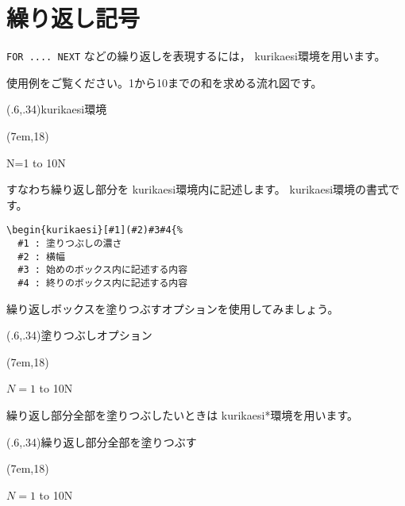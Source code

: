 \documentclass[a4j]{jarticle}
\begin{document}
\section{繰り返し記号}
\verb+FOR .... NEXT+ などの繰り返しを表現するには，
\textsf{kurikaesi}環境を用います。

使用例をご覧ください。1から10までの和を求める流れ図です。

\begin{showEx}(.6,.34){\textsf{kurikaesi}環境}
\begin{nagarezu}%
  (7em,18\baselineskip)
\sitahe
{}
\sitahe
\begin{kurikaesi}{N=1 to 10}{N}
\sitahe
{}
\sitahe
\end{kurikaesi}
\sitahe
{}
\sitahe
{}
\end{nagarezu}%
\end{showEx}

すなわち繰り返し部分を \textsf{kurikaesi}環境内に記述します。
\textsf{kurikaesi}環境の書式です。

\begin{boxnote}
\begin{verbatim}
\begin{kurikaesi}[#1](#2)#3#4{%
  #1 : 塗りつぶしの濃さ
  #2 : 横幅
  #3 : 始めのボックス内に記述する内容
  #4 : 終りのボックス内に記述する内容
\end{verbatim}
\end{boxnote}

繰り返しボックスを塗りつぶすオプションを使用してみましょう。

\begin{showEx}(.6,.34){塗りつぶしオプション}
\begin{caprm}
\begin{nagarezu}(7em,18\baselineskip)
\sitahe
{}
\sitahe
\begin{kurikaesi}[.5]{$N=1$ to 10}{N}
\sitahe
{}
\sitahe
\end{kurikaesi}
\sitahe
{}
\sitahe
{}
\end{nagarezu}%
\end{caprm}
\end{showEx}

\bigskip

繰り返し部分全部を塗りつぶしたいときは \textsf{kurikaesi*}環境を用います。

\begin{showEx}(.6,.34){繰り返し部分全部を塗りつぶす}
\begin{caprm}
\begin{nagarezu}(7em,18\baselineskip)
\sitahe
{}
\sitahe
\begin{kurikaesi*}[.5]{$N=1$ to 10}{N}
\sitahe
{}
\sitahe
\end{kurikaesi*}
\sitahe
{}
\sitahe
{}
\end{nagarezu}%
\end{caprm}
\end{showEx}
\end{document}
